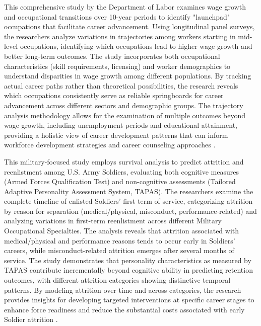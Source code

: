 \documentclass[../main.tex]{subfiles}
\begin{document}
This comprehensive study by the Department of Labor examines wage growth and occupational transitions over 10-year periods to identify "launchpad" occupations that facilitate career advancement. Using longitudinal panel surveys, the researchers analyze variations in trajectories among workers starting in mid-level occupations, identifying which occupations lead to higher wage growth and better long-term outcomes. The study incorporates both occupational characteristics (skill requirements, licensing) and worker demographics to understand disparities in wage growth among different populations. By tracking actual career paths rather than theoretical possibilities, the research reveals which occupations consistently serve as reliable springboards for career advancement across different sectors and demographic groups. The trajectory analysis methodology allows for the examination of multiple outcomes beyond wage growth, including unemployment periods and educational attainment, providing a holistic view of career development patterns that can inform workforce development strategies and career counseling approaches \citep{dol2023career}.

This military-focused study employs survival analysis to predict attrition and reenlistment among U.S. Army Soldiers, evaluating both cognitive measures (Armed Forces Qualification Test) and non-cognitive assessments (Tailored Adaptive Personality Assessment System, TAPAS). The researchers examine the complete timeline of enlisted Soldiers' first term of service, categorizing attrition by reason for separation (medical/physical, misconduct, performance-related) and analyzing variations in first-term reenlistment across different Military Occupational Specialties. The analysis reveals that attrition associated with medical/physical and performance reasons tends to occur early in Soldiers' careers, while misconduct-related attrition emerges after several months of service. The study demonstrates that personality characteristics as measured by TAPAS contribute incrementally beyond cognitive ability in predicting retention outcomes, with different attrition categories showing distinctive temporal patterns. By modeling attrition over time and across categories, the research provides insights for developing targeted interventions at specific career stages to enhance force readiness and reduce the substantial costs associated with early Soldier attrition \citep{niessen2016attrition}.
\end{document}
